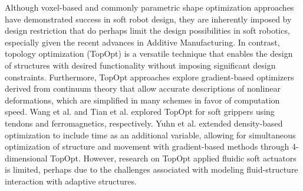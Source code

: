 Although voxel-based \cite{Kriegman2019,Cheney2013} and commonly parametric shape optimization \cite{Coevoet2017,Manns2018Jan,Morzadec2019Apr} approaches have demonstrated success in soft robot design, they are inherently imposed by  design restriction that do perhaps limit the design possibilities in soft robotics, especially given the recent advances in Additive Manufacturing. In contrast, topology optimization \cite{Bendsoe2003,Gain2013Dec,Zhang2017Topo} (TopOpt) is a versatile technique that enables the design of structures with desired functionality without imposing significant design constraints. Furthermore, TopOpt approaches explore gradient-based optimizers derived from continuum theory that allow accurate descriptions of nonlinear deformations, which are simplified in many schemes in favor of computation speed. Wang et al. \cite{Wang2020Nov} and Tian et al. \cite{Tian2020May} explored TopOpt for soft grippers using tendons and ferromagnetics, respectively. Yuhn et al. \cite{Yuhn2023Feb} extended density-based optimization to include time as an additional variable, allowing for simultaneous optimization of structure and movement with gradient-based methods through 4-dimensional TopOpt. However, research on TopOpt applied fluidic soft actuators is limited, perhaps due to the challenges associated with modeling fluid-structure interaction with adaptive structures.

\vspace{-2mm}
